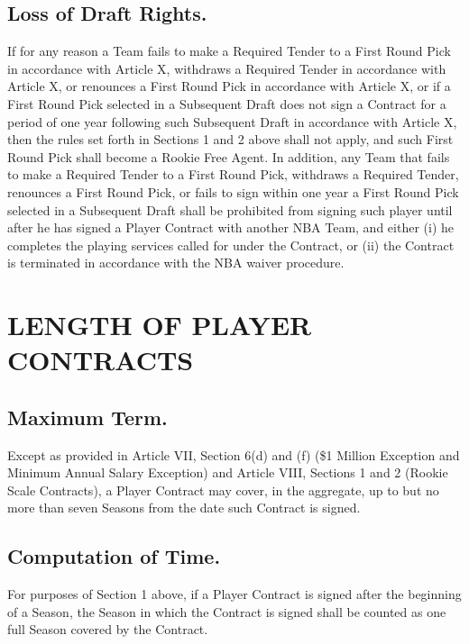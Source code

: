 \documentclass[
]{book}
\begin{document}
\hypertarget{loss-of-draft-rights.}{%
\section{Loss of Draft Rights.}\label{loss-of-draft-rights.}}

If for any reason a Team fails to make a Required Tender to a First Round Pick in accordance with Article X, withdraws a Required Tender in accordance with Article X, or renounces a First Round Pick in accordance with Article X, or if a First Round Pick selected in a Subsequent Draft does not sign a Contract for a period of one year following such Subsequent Draft in accordance with Article X, then the rules set forth in Sections 1 and 2 above shall not apply, and such First Round Pick shall become a Rookie Free Agent. In addition, any Team that fails to make a Required Tender to a First Round Pick, withdraws a Required Tender, renounces a First Round Pick, or fails to sign within one year a First Round Pick selected in a Subsequent Draft shall be prohibited from signing such player until after he has signed a Player Contract with another NBA Team, and either (i) he completes the playing services called for under the Contract, or (ii) the Contract is terminated in accordance with the NBA waiver procedure.

\hypertarget{length-of-player-contracts}{%
\chapter{LENGTH OF PLAYER CONTRACTS}\label{length-of-player-contracts}}

\hypertarget{maximum-term.}{%
\section{Maximum Term.}\label{maximum-term.}}

Except as provided in Article VII, Section 6(d) and (f) (\$1 Million Exception and Minimum Annual Salary Exception) and Article VIII, Sections 1 and 2 (Rookie Scale Contracts), a Player Contract may cover, in the aggregate, up to but no more than seven Seasons from the date such Contract is signed.

\hypertarget{computation-of-time.}{%
\section{Computation of Time.}\label{computation-of-time.}}

For purposes of Section 1 above, if a Player Contract is signed after the beginning of a Season, the Season in which the Contract is signed shall be counted as one full Season covered by the Contract.
\end{document}
